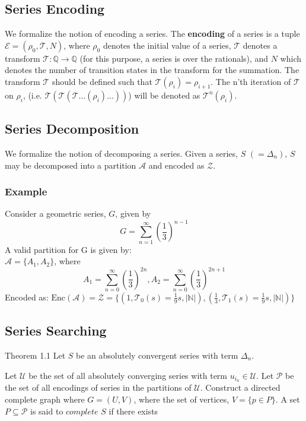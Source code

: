 \documentclass{article}
\begin{document}
\subsection{Series Encoding}

We formalize the notion of encoding a series. The \textbf{encoding} of a series is a tuple 
$\mathcal{E} = (\rho_{0}, \mathcal{T}, N)$, where $\rho_{0}$ denotes the initial value of a series, 
$\mathcal{T}$ denotes a transform $\mathcal{T}: \mathbb{Q} \rightarrow \mathbb{Q}$ (for this purpose, 
a series is over the rationals), and $N$ which denotes the number of transition states in the transform for 
the summation. The transform $\mathcal{T}$ should be defined such that $\mathcal{T}(\rho_{i}) = \rho_{i+1}$.
The n'th iteration of $\mathcal{T}$ on $\rho_{i}$, (i.e. $\mathcal{T}(\mathcal{T}(\mathcal{T}...(\rho_{i})...))$) will 
be denoted as $\mathcal{T}^n(\rho_{i})$.

\subsection{Series Decomposition}

We formalize the notion of decomposing a series. Given a series, $S$ $(=\Delta_n)$, $S$ may be decomposed 
into a partition $\mathcal{A}$ and encoded as $\mathcal{Z}$.

\subsubsection{Example} 

Consider a geometric series, $G$, given by \[ G = \sum_{n=1}^{\infty} (\frac{1}{3})^{n-1} \]
A valid partition for G is given by:\\
$\mathcal{A} = \{A_1, A_2\}$, where\\ \[A_1 = \sum_{n=0}^{\infty} (\frac{1}{3})^{2n} , A_2 = \sum_{n=0}^{\infty} (\frac{1}{3})^{2n+1} \]
Encoded as: $\text{Enc}(\mathcal{A}) = \mathcal{Z} = 
\{(1, \mathcal{T}_0(s) = \frac{1}{9}s, |\mathbb{N}|),(\frac{1}{3}, \mathcal{T}_1(s) = \frac{1}{9}s, |\mathbb{N}|) \}$

\subsection{Series Searching}

Theorem 1.1
Let $S$ be an absolutely convergent series with term $\Delta_n$.

Let $\mathcal{U}$ be the set of all absolutely converging series with term $u_{i_n} \in \mathcal{U}$. Let $\mathcal{P}$ be the set of all encodings of series in the partitions of $\mathcal{U}$. Construct a directed complete graph where $G = (U, V)$, where the set of vertices, $V = \{p \in P\}$. A set $P \subseteq \mathcal{P}$ is said to $complete$ $S$ if there exists 
\end{document}
